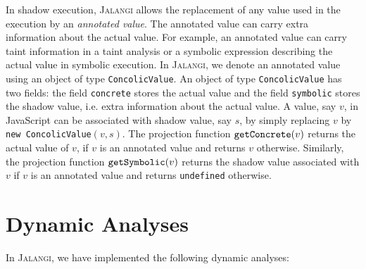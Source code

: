 \documentclass{sig-alternate}
\def\jalangi{\textsc{Jalangi}}
\newcommand \Actual{{\tt getConcrete}}
\newcommand \Shadow{{\tt getSymbolic}}
\begin{document}
In shadow execution, \jalangi{} allows the replacement of any value
used in the execution by an \emph{annotated value}.  The annotated
value can carry extra information about the actual value.  For
example, an annotated value can carry taint information in a taint
analysis or a symbolic expression describing the actual value in
symbolic execution.  In \jalangi{}, we denote an annotated value using
an object of type \texttt{ConcolicValue}.  An object of type
\texttt{ConcolicValue} has two fields: the field \texttt{concrete}
stores the actual value and the field \texttt{symbolic} stores the
shadow value, i.e. extra information about the actual value.  A value,
say $v$, in JavaScript can be associated with shadow value, say $s$,
by simply replacing $v$ by \texttt{new ConcolicValue}$(v, s)$.  The
projection function $\Actual(v)$ returns the actual value of $v$, if
$v$ is an annotated value and returns $v$ otherwise.  Similarly, the
projection function $\Shadow(v)$ returns the shadow value associated
with $v$ if $v$ is an annotated value and returns \texttt{undefined}
otherwise.

\section{Dynamic Analyses}
\label{sec:dynamic-analyses}

In \jalangi{}, we have implemented the following dynamic analyses:
\end{document}
